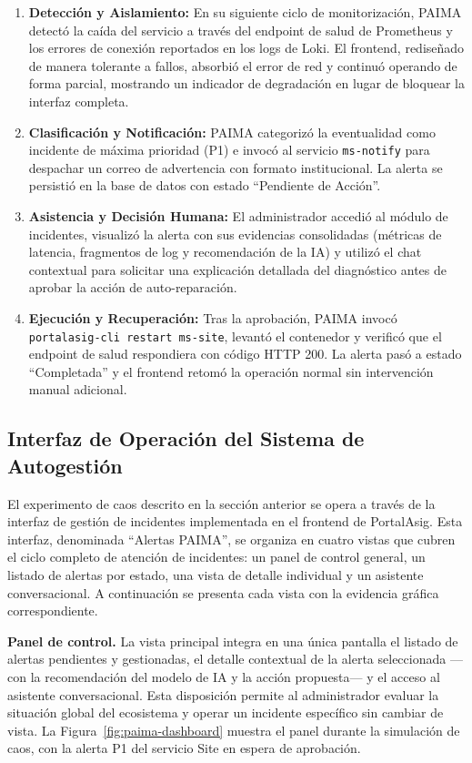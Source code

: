 \begin{enumerate}
    \item \textbf{Detección y Aislamiento:} En su siguiente ciclo de monitorización,
    PAIMA detectó la caída del servicio a través del endpoint de salud de
    Prometheus y los errores de conexión reportados en los logs de Loki. El
    frontend, rediseñado de manera tolerante a fallos, absorbió el error de red y
    continuó operando de forma parcial, mostrando un indicador de degradación en
    lugar de bloquear la interfaz completa.
    \item \textbf{Clasificación y Notificación:} PAIMA categorizó la eventualidad
    como incidente de máxima prioridad (P1) e invocó al servicio \texttt{ms-notify}
    para despachar un correo de advertencia con formato institucional. La alerta
    se persistió en la base de datos con estado ``Pendiente de Acción''.
    \item \textbf{Asistencia y Decisión Humana:} El administrador accedió al
    módulo de incidentes, visualizó la alerta con sus evidencias consolidadas
    (métricas de latencia, fragmentos de log y recomendación de la IA) y utilizó
    el chat contextual para solicitar una explicación detallada del diagnóstico
    antes de aprobar la acción de auto-reparación.
    \item \textbf{Ejecución y Recuperación:} Tras la aprobación, PAIMA invocó
    \texttt{portalasig-cli restart ms-site}, levantó el contenedor y verificó
    que el endpoint de salud respondiera con código HTTP 200. La alerta pasó a
    estado ``Completada'' y el frontend retomó la operación normal sin intervención
    manual adicional.
\end{enumerate}

\subsection{Interfaz de Operación del Sistema de Autogestión}

El experimento de caos descrito en la sección anterior se opera a través de la
interfaz de gestión de incidentes implementada en el frontend de PortalAsig.
Esta interfaz, denominada ``Alertas PAIMA'', se organiza en cuatro vistas que
cubren el ciclo completo de atención de incidentes: un panel de control general,
un listado de alertas por estado, una vista de detalle individual y un asistente
conversacional. A continuación se presenta cada vista con la evidencia gráfica
correspondiente.

\textbf{Panel de control.} La vista principal integra en una única pantalla el
listado de alertas pendientes y gestionadas, el detalle contextual de la alerta
seleccionada ---con la recomendación del modelo de IA y la acción propuesta--- y
el acceso al asistente conversacional. Esta disposición permite al administrador
evaluar la situación global del ecosistema y operar un incidente específico sin
cambiar de vista. La Figura~\ref{fig:paima-dashboard} muestra el panel durante la
simulación de caos, con la alerta P1 del servicio Site en espera de aprobación.

